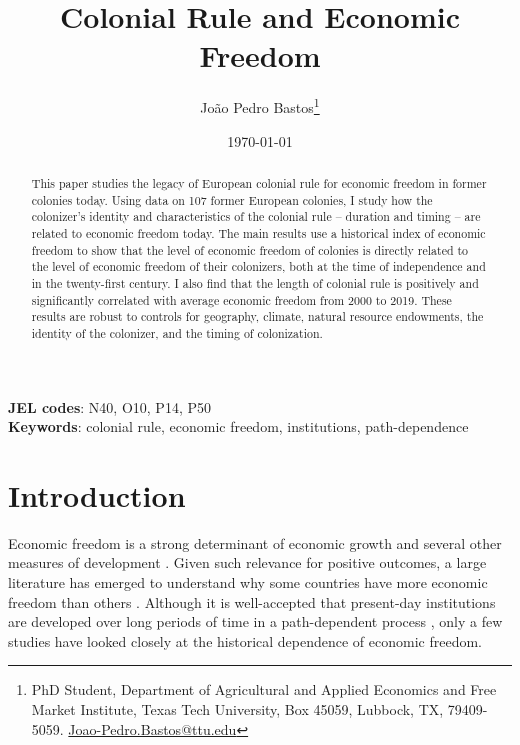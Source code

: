 \documentclass[a4paper,12pt]{article}
\title{Colonial Rule and Economic Freedom
       \bigskip}
\author{Jo\~{a}o Pedro Bastos\thanks{PhD Student, Department of Agricultural and Applied Economics and Free Market Institute, Texas Tech University, Box 45059, Lubbock, TX, 79409-5059. \url{Joao-Pedro.Bastos@ttu.edu}}}
\date{\today}
\begin{document}

\maketitle

\begin{abstract}
\noindent This paper studies the legacy of European colonial rule for economic freedom in former colonies today. Using data on 107 former European colonies, I study how the colonizer's identity and characteristics of the colonial rule -- duration and timing -- are related to economic freedom today. The main results use a historical index of economic freedom to show that the level of economic freedom of colonies is directly related to the level of economic freedom of their colonizers, both at the time of independence and in the twenty-first century. I also find that the length of colonial rule is positively and significantly correlated with average economic freedom from 2000 to 2019. These results are robust to controls for geography, climate, natural resource endowments, the identity of the colonizer, and the timing of colonization.

\end{abstract}

\bigskip \bigskip
\begin{footnotesize}
\noindent \textbf{JEL codes}: N40, O10, P14, P50 \\
\noindent \textbf{Keywords}: colonial rule, economic freedom, institutions, path-dependence
\end{footnotesize}

\clearpage
\doublespacing

\section{Introduction} 
    \label{sec:Intro}

Economic freedom is a strong determinant of economic growth and several other measures of development \citep{dehaan2006market,Hall2014,LawsonMiozziTuszynski2024}. Given such relevance for positive outcomes, a large literature has emerged to understand why some countries have more economic freedom than others \citep{lawson2020determinants}. Although it is well-accepted that present-day institutions are developed over long periods of time in a path-dependent process \citep{North1991,spolaore2013deep}, only a few studies have looked closely at the historical dependence of economic freedom. 
\end{document}
